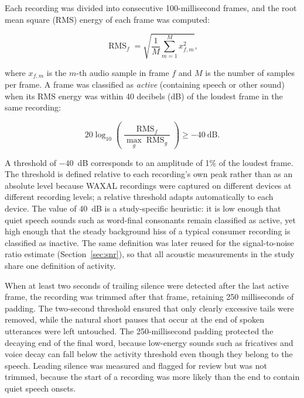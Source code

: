 Each recording was divided into consecutive 100-millisecond frames, and the
root mean square (RMS) energy of each frame was computed:

\begin{equation}
    \operatorname{RMS}_f = \sqrt{\frac{1}{M}\sum_{m=1}^{M} x_{f,m}^2},
    \label{eq:rms}
\end{equation}

where $x_{f,m}$ is the $m$-th audio sample in frame $f$ and $M$ is the number of
samples per frame. A frame was classified as \emph{active} (containing speech or
other sound) when its RMS energy was within 40 decibels (dB) of the loudest frame
in the same recording:

\begin{equation}
    20\log_{10}\!\left(\frac{\operatorname{RMS}_f}{\max_{g}\operatorname{RMS}_g}\right) \geq -40~\text{dB}.
    \label{eq:active}
\end{equation}

A threshold of $-40$~dB corresponds to an amplitude of 1\% of the loudest frame.
The threshold is defined relative to each recording's own peak rather than as an
absolute level because WAXAL recordings were captured on different devices at
different recording levels; a relative threshold adapts automatically to each
device. The value of 40~dB is a study-specific heuristic: it is low enough that
quiet speech sounds such as word-final consonants remain classified as active,
yet high enough that the steady background hiss of a typical consumer recording
is classified as inactive. The same definition was later reused for the
signal-to-noise ratio estimate (Section~\ref{sec:snr}), so that all acoustic
measurements in the study share one definition of activity.

When at least two seconds of trailing silence were detected after the last active
frame, the recording was trimmed after that frame, retaining 250 milliseconds of
padding. The two-second threshold ensured that only clearly excessive tails were
removed, while the natural short pauses that occur at the end of spoken
utterances were left untouched. The 250-millisecond padding protected the decaying
end of the final word, because low-energy sounds such as fricatives and voice
decay can fall below the activity threshold even though they belong to the
speech. Leading silence was measured and flagged for review but was not trimmed,
because the start of a recording was more likely than the end to contain quiet
speech onsets.

